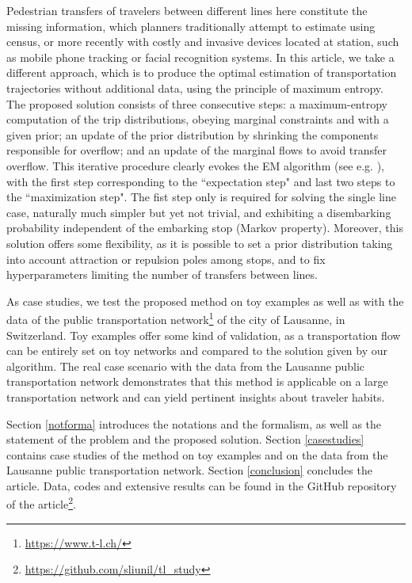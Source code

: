 \documentclass{bmcart}
\begin{document}
Pedestrian transfers of travelers between different lines here constitute the missing information, which planners traditionally attempt to estimate using census, or more recently with costly and invasive devices located at station, such as mobile phone tracking or facial recognition systems. In this article, we take a different approach, which is to produce the optimal estimation of transportation trajectories without additional data, using the principle of maximum entropy. The proposed solution consists of three consecutive steps: a maximum-entropy computation of the trip distributions, obeying marginal constraints and with a given prior;  an update of the prior distribution by shrinking the components responsible for overflow; and an update of the marginal flows to avoid transfer overflow. This iterative procedure clearly evokes the EM algorithm (see e.g. \cite{dempster1977maximum}  \cite{bavaud2009information}), with the first step corresponding to the ``expectation step" and last two steps to the ``maximization step". The fist step only is required for solving the single line case, naturally much simpler but  yet  not trivial, and exhibiting a disembarking probability independent of the embarking stop (Markov property). Moreover, this solution offers some flexibility, as it is possible to set a prior distribution taking into account attraction or repulsion poles among stops, and to fix hyperparameters limiting the number of transfers between lines.

As case studies, we test the proposed method on toy examples as well as with the data of the public transportation network\footnote{\url{https://www.t-l.ch/}} of the city of Lausanne, in Switzerland. Toy examples offer some kind of validation, as a transportation flow can be entirely set on toy networks and compared to the solution given by our algorithm. The real case scenario with the data from the Lausanne public transportation network demonstrates that this method is applicable on a large transportation network and can yield pertinent insights about traveler habits.

Section \ref{notforma} introduces the notations and the formalism, as well as the statement of the problem and the proposed solution. Section \ref{casestudies} contains case studies of the method on toy examples and on the data from the Lausanne public transportation network. Section \ref{conclusion} concludes the article. Data, codes and extensive results can be found in the GitHub repository of the article\footnote{\url{https://github.com/sliunil/tl_study}}.
\end{document}
